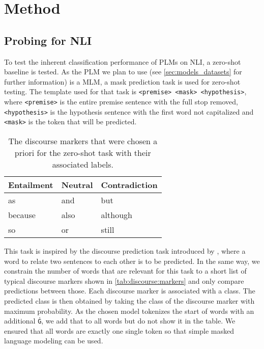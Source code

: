 \section{Method} \label{sec:method}
\subsection{Probing for \acs{NLI}}
To test the inherent classification performance of \acp{PLM} on \acs{NLI}, a zero-shot baseline is tested. As the \ac{PLM} we plan to use (see \autoref{sec:models_datasets} for further information) is a \ac{MLM}, a mask prediction task is used for zero-shot testing. The template used for that task is \texttt{<premise> <mask> <hypothesis>}, where \texttt{<premise>} is the entire premise sentence with the full stop removed, \texttt{<hypothesis>} is the hypothesis sentence with the first word not capitalized and \texttt{<mask>} is the token that will be predicted.

\begin{table}[ht]
    \centering
    \caption{The discourse markers that were chosen a priori for the zero-shot task with their associated labels.}
    \small
    \begin{tabular}{l | l | l}
        \multicolumn{1}{c|}{Entailment} & \multicolumn{1}{c|}{Neutral} & \multicolumn{1}{c}{Contradiction} \\
        \hline
        as & and  & but \\
        because & also & although \\
        so & or & still
    \end{tabular}
    \label{tab:discourse:markers}
\end{table}

This task is inspired by the discourse prediction task introduced by \cite{dissent}, where a word to relate two sentences to each other is to be predicted. In the same way, we constrain the number of words that are relevant for this task to a short list of typical discourse markers shown in \autoref{tab:discourse:markers} and only compare predictions between those. Each discourse marker is associated with a class. The predicted class is then obtained by taking the class of the discourse marker with maximum probability. As the chosen model tokenizes the start of words with an additional \texttt{Ġ}, we add that to all words but do not show it in the table. We ensured that all words are exactly one single token so that simple masked language modeling can be used.


